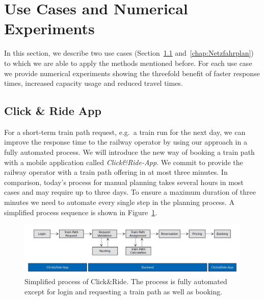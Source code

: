 \section{Use Cases and Numerical Experiments}
\label{chap:useCases}

In this section, we describe two use cases (Section~\ref{chap:CnR} and~\ref{chap:Netzfahrplan}) to which we are able to apply the methods mentioned before. For each use case we provide numerical experiments showing the threefold benefit of faster response times, increased capacity usage and reduced travel times.

\subsection{Click \& Ride App}
\label{chap:CnR}
For a short-term train path request, e.g.\ a train run for the next day, we can improve the response time to the railway operator by using our approach in a fully automated process. We will introduce the new way of booking a train path with a mobile application called \emph{Click\&Ride-App}. We commit to provide the railway operator with a train path offering in at most three minutes. In comparison, today's process for manual planning takes several hours in most cases and may require up to three days. To ensure a maximum duration of three minutes we need to automate every single step in the planning process. A simplified process sequence is shown in Figure~\ref{fig:process_sequence}.
%
\begin{figure}[htb]
	\centering
	\includegraphics[width=\textwidth]{Bilder/process_sequence.jpg}
	\caption{Simplified process of Click\&Ride. The process is fully automated except for login and requesting a train path as well as booking.}
	\label{fig:process_sequence}
\end{figure}

